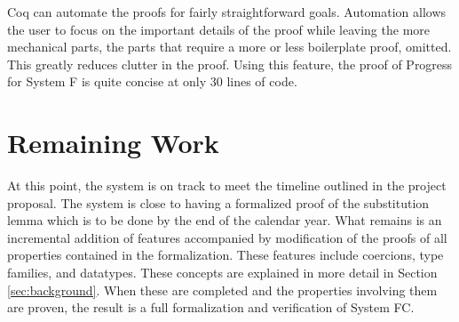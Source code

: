 \documentclass{sig-alternate}
\begin{document}
Coq can automate the proofs for fairly straightforward goals. Automation allows the user to focus on the important details of the proof while leaving the more mechanical parts, the parts that require a more or less boilerplate proof, omitted. This greatly reduces clutter in the proof. Using this feature, the proof of Progress for System F is quite concise at only 30 lines of code.

\section{Remaining Work}
\label{sec:remaining}
At this point, the system is on track to meet the timeline outlined in the project proposal. The system is close to having a formalized proof of the substitution lemma which is to be done by the end of the calendar year. What remains is an incremental addition of features accompanied by modification of the proofs of all properties contained in the formalization. These features include coercions, type families, and datatypes. These concepts are explained in more detail in Section \ref{sec:background}. When these are completed and the properties involving them are proven, the result is a full formalization and verification of System FC.


\vspace{175pt}
\end{document}
